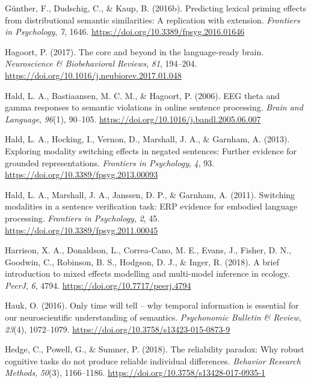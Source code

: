 \documentclass[
  12pt,
  man,floatsintext]{apa7}
\newlength{\cslhangindent}
\newlength{\cslentryspacingunit} %
\newenvironment{CSLReferences}[2] %
 {%
  \setlength{\parindent}{0pt}
  \ifodd #1
  \let\oldpar\par
  \def\par{\hangindent=\cslhangindent\oldpar}
  \fi
  \setlength{\parskip}{#2\cslentryspacingunit}
 }%
 {}
\begin{document}
\begin{CSLReferences}{1}{0}
\leavevmode{}%
Günther, F., Dudschig, C., \& Kaup, B. (2016b). Predicting lexical priming effects from distributional semantic similarities: {A} replication with extension. \emph{Frontiers in Psychology}, \emph{7}, 1646. \url{https://doi.org/10.3389/fpsyg.2016.01646}

\leavevmode{}%
Hagoort, P. (2017). The core and beyond in the language-ready brain. \emph{Neuroscience \& Biobehavioral Reviews}, \emph{81}, 194--204. \url{https://doi.org/10.1016/j.neubiorev.2017.01.048}

\leavevmode{}%
Hald, L. A., Bastiaansen, M. C. M., \& Hagoort, P. (2006). {EEG} theta and gamma responses to semantic violations in online sentence processing. \emph{Brain and Language}, \emph{96}(1), 90--105. \url{https://doi.org/10.1016/j.bandl.2005.06.007}

\leavevmode{}%
Hald, L. A., Hocking, I., Vernon, D., Marshall, J. A., \& Garnham, A. (2013). Exploring modality switching effects in negated sentences: {Further} evidence for grounded representations. \emph{Frontiers in Psychology}, \emph{4}, 93. \url{https://doi.org/10.3389/fpsyg.2013.00093}

\leavevmode{}%
Hald, L. A., Marshall, J. A., Janssen, D. P., \& Garnham, A. (2011). Switching modalities in a sentence verification task: {ERP} evidence for embodied language processing. \emph{Frontiers in Psychology}, \emph{2}, 45. \url{https://doi.org/10.3389/fpsyg.2011.00045}

\leavevmode{}%
Harrison, X. A., Donaldson, L., Correa-Cano, M. E., Evans, J., Fisher, D. N., Goodwin, C., Robinson, B. S., Hodgson, D. J., \& Inger, R. (2018). A brief introduction to mixed effects modelling and multi-model inference in ecology. \emph{PeerJ}, \emph{6}, 4794. \url{https://doi.org/10.7717/peerj.4794}

\leavevmode{}%
Hauk, O. (2016). Only time will tell -- why temporal information is essential for our neuroscientific understanding of semantics. \emph{Psychonomic Bulletin \& Review}, \emph{23}(4), 1072--1079. \url{https://doi.org/10.3758/s13423-015-0873-9}

\leavevmode{}%
Hedge, C., Powell, G., \& Sumner, P. (2018). The reliability paradox: {Why} robust cognitive tasks do not produce reliable individual differences. \emph{Behavior Research Methods}, \emph{50}(3), 1166--1186. \url{https://doi.org/10.3758/s13428-017-0935-1}


\end{CSLReferences}
\end{document}
